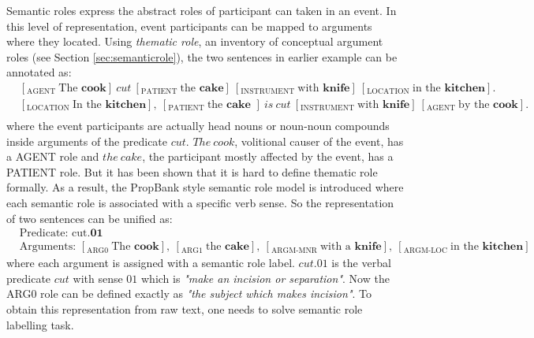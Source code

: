 \documentclass[a4paper]{article}
\begin{document}
Semantic roles express the abstract roles of participant can taken in an event. In this level of representation, event participants can be mapped to arguments where they located. Using \textit{thematic role}, an inventory of conceptual argument roles (see Section \ref{sec:semanticrole}), the two sentences in earlier example can be annotated as: 
\begin{equation*} \label{eg:thematic}
\begin{aligned}
    & [_\text{AGENT }\text{The }\textbf{cook}]\ cut\ [_\text{PATIENT }\text{the }\textbf{cake}]\ [_\text{INSTRUMENT }\text{with }\textbf{knife}]\ [_\text{LOCATION }\text{in the }\textbf{kitchen}]. \\
    & [_\text{LOCATION }\text{In the }\textbf{kitchen}],\ [_\text{PATIENT }\text{the }\textbf{cake }]\ is \ cut\ [_\text{INSTRUMENT }\text{with }\textbf{knife}]\ [_\text{AGENT }\text{by the }\textbf{cook}].\\
\end{aligned}
\end{equation*} 
where the event participants are actually head nouns or noun-noun compounds inside arguments of the predicate $cut$. $The\ cook$, volitional causer of the event, has a AGENT role and $the\ cake$, the participant mostly affected by the event, has a PATIENT role. But it has been shown that it is hard to define thematic role formally. As a result, the PropBank \citep{palmer2005proposition} style semantic role model is introduced where each semantic role is associated with a specific verb sense. So the representation of two sentences can be unified as: 
\begin{equation*} \label{eg:probank}
\begin{aligned}
    & \text{Predicate: cut.}\textbf{01} \\
    & \text{Arguments: } [_\text{ARG0 }\text{The }\textbf{cook}], \ [_\text{ARG1 }\text{the }\textbf{cake}], \ [_\text{ARGM-MNR }\text{with a }\textbf{knife}], \ [_\text{ARGM-LOC }\text{in the }\textbf{kitchen}]
\end{aligned}
\end{equation*} 
where each argument is assigned with a semantic role label. $cut.01$ is the verbal predicate $cut$ with sense $01$ which is \textit{"make an incision or separation"}. Now the ARG0 role can be defined exactly as \textit{"the subject which makes incision"}. To obtain this representation from raw text, one needs to solve semantic role labelling task. 
\end{document}
